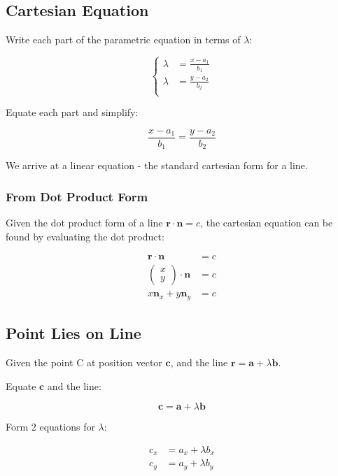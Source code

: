 \documentclass[a4paper,11pt]{article}
\newcommand{\bb}{\boldsymbol}
\begin{document}
\subsection{Cartesian Equation}

Write each part of the parametric equation in terms of $\lambda$:

$$
\begin{cases}
	\lambda & = \frac{x - a_1}{b_1} \\
	\lambda & = \frac{y - a_2}{b_2} \\
\end{cases}
$$

Equate each part and simplify:

$$
\frac{x - a_1}{b_1} = \frac{y - a_2}{b_2}
$$

We arrive at a linear equation - the standard cartesian form for a line.


\subsubsection{From Dot Product Form}

Given the dot product form of a line $\bb{r} \cdot \bb{n} = c$, the cartesian
equation can be found by evaluating the dot product:

$$
\begin{aligned}
	\bb{r} \cdot \bb{n} & = c \\
	\begin{pmatrix} x\\ y \end{pmatrix} \cdot \bb{n} & = c \\
	x \bb{n}_x + y \bb{n}_y & = c
\end{aligned}
$$


\subsection{Point Lies on Line}

Given the point C at position vector $\bb{c}$, and the line
$\bb{r} = \bb{a} + \lambda \bb{b}$.

Equate $\bb{c}$ and the line:

$$
\bb{c} = \bb{a} + \lambda \bb{b}
$$

Form 2 equations for $\lambda$:

$$
\begin{aligned}
	c_x & = a_x + \lambda b_x \\
	c_y & = a_y + \lambda b_y \\
\end{aligned}
$$
\end{document}
